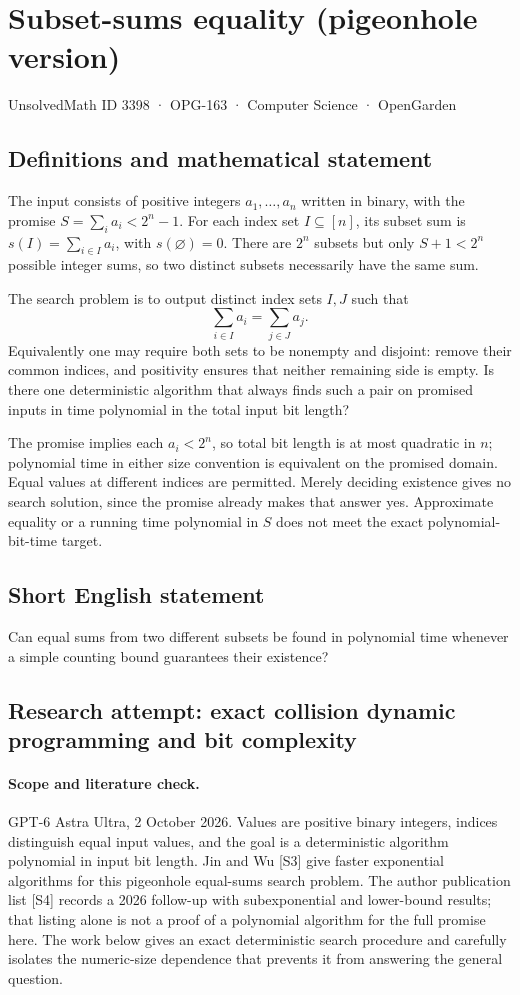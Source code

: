\documentclass[11pt,a4paper]{article}
\begin{document}
\section*{Subset-sums equality (pigeonhole version)}\label{3398}
{\small UnsolvedMath ID 3398 · OPG-163 · Computer Science · OpenGarden}
\subsection{Definitions and mathematical statement}
The input consists of positive integers $a_1,\ldots,a_n$ written in
binary, with the promise
$S=\sum_i a_i<2^n-1$. For each index set $I\subseteq[n]$, its subset
sum is $s(I)=\sum_{i\in I}a_i$, with $s(\varnothing)=0$.
There are $2^n$ subsets but only $S+1<2^n$ possible integer sums,
so two distinct subsets necessarily have the same sum.

The search problem is to output distinct index sets $I,J$ such that
\[
                         \sum_{i\in I}a_i=\sum_{j\in J}a_j.
\]
Equivalently one may require both sets to be nonempty and disjoint:
remove their common indices, and positivity ensures that neither
remaining side is empty. Is there one deterministic algorithm that
always finds such a pair on promised inputs in time polynomial in
the total input bit length?

The promise implies each $a_i<2^n$, so total bit length is at most
quadratic in $n$; polynomial time in either size convention is
equivalent on the promised domain. Equal values at different indices
are permitted. Merely deciding existence gives no search solution,
since the promise already makes that answer yes. Approximate
equality or a running time polynomial in $S$ does not meet the
exact polynomial-bit-time target.
\subsection{Short English statement}
Can equal sums from two different subsets be found in polynomial time whenever a simple counting bound guarantees their existence?
\subsection{Research attempt: exact collision dynamic programming and bit complexity}
\paragraph{Scope and literature check.}
GPT-6 Astra Ultra, 2 October 2026. Values are positive binary integers,
indices distinguish equal input values, and the goal is a deterministic
algorithm polynomial in input bit length. Jin and Wu [S3] give faster
exponential algorithms for this pigeonhole equal-sums search problem.
The author publication list [S4] records a 2026 follow-up with
subexponential and lower-bound results; that listing alone is not a
proof of a polynomial algorithm for the full promise here. The work
below gives an exact deterministic search procedure and carefully
isolates the numeric-size dependence that prevents it from answering
the general question.
\end{document}
